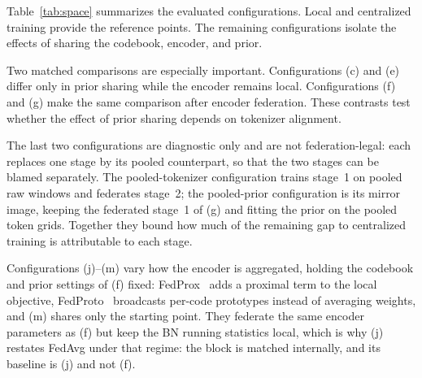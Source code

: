 \documentclass[conference]{IEEEtran}
\begin{document}
Table~\ref{tab:space} summarizes the evaluated configurations. Local and centralized training provide the reference points. The remaining configurations isolate the effects of sharing the codebook, encoder, and prior.

Two matched comparisons are especially important. Configurations (c) and (e) differ only in prior sharing while the encoder remains local. Configurations (f) and (g) make the same comparison after encoder federation. These contrasts test whether the effect of prior sharing depends on tokenizer alignment.

The last two configurations are diagnostic only and are not federation-legal: each replaces one stage by its pooled counterpart, so that the two stages can be blamed separately. The pooled-tokenizer configuration trains stage~1 on pooled raw windows and federates stage~2; the pooled-prior configuration is its mirror image, keeping the federated stage~1 of (g) and fitting the prior on the pooled token grids. Together they bound how much of the remaining gap to centralized training is attributable to each stage.

Configurations (j)--(m) vary how the encoder is aggregated, holding the codebook and prior settings of (f) fixed: FedProx~\cite{li2020fedprox} adds a proximal term to the local objective, FedProto~\cite{tan2022fedproto} broadcasts per-code prototypes instead of averaging weights, and (m) shares only the starting point. They federate the same encoder parameters as (f) but keep the BN running statistics local, which is why (j) restates FedAvg under that regime: the block is matched internally, and its baseline is (j) and not (f).
\end{document}

